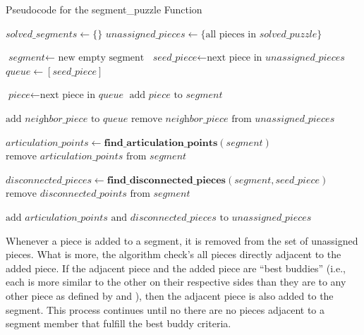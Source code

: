 \begin{algorithm}
\caption{Pseudocode for the segment\_puzzle Function}\label{alg:segmentPuzzle}
\begin{algorithmic}[1]
    \State $\textit{solved\_segments} \gets \{ \}$
    \State $\textit{unassigned\_pieces} \gets \{ \text{all pieces in } \textit{solved\_puzzle} \}$
\item[]
        \State $\textit{segment} \gets \text{ new empty segment}$
        \State $\textit{seed\_piece} \gets \text{next piece in } \textit{unassigned\_pieces}$
        \State $\textit{queue} \gets [\textit{seed\_piece}]$
\item[]
            \State $\textit{piece} \gets \text{next piece in }\textit{queue}$
            \State $\text{add } \textit{piece} \text{ to } \textit{segment}$
\item[]
            		\State $\text{add } \textit{neighbor\_piece} \text{ to } \textit{queue}$
            		\State $\text{remove } \textit{neighbor\_piece} \text{ from } \textit{unassigned\_pieces}$
            	\EndIf
            \EndFor
        \EndWhile
\item[]
        \State $\textit{articulation\_points} \gets \textbf{find\_articulation\_points}(\textit{segment})$
        \State $\text{remove } \textit{articulation\_points} \text{ from } \textit{segment}$
\item[]
		\State $\textit{disconnected\_pieces} \gets \textbf{find\_disconnected\_pieces}(\textit{segment},\textit{seed\_piece})$        
        \State $\text{remove } \textit{disconnected\_points} \text{ from } \textit{segment}$
\item[]
        \State $\text{add } \textit{articulation\_points} \text{ and } \textit{disconnected\_pieces} \text{ to } \textit{unassigned\_pieces}$
    \EndWhile
\EndProcedure
\end{algorithmic}
\end{algorithm}

Whenever a piece is added to a segment, it is removed from the set of unassigned pieces. What is more, the algorithm check's all pieces directly adjacent to the added piece.  If the adjacent piece and the added piece are ``best buddies'' (i.e., each is more similar to the other on their respective sides than they are to any other piece as defined by \cite{pomeranz2011} and \cite{paikin2015}), then the adjacent piece is also added to the segment.  This process continues until no there are no pieces adjacent to a segment member that fulfill the best buddy criteria.

